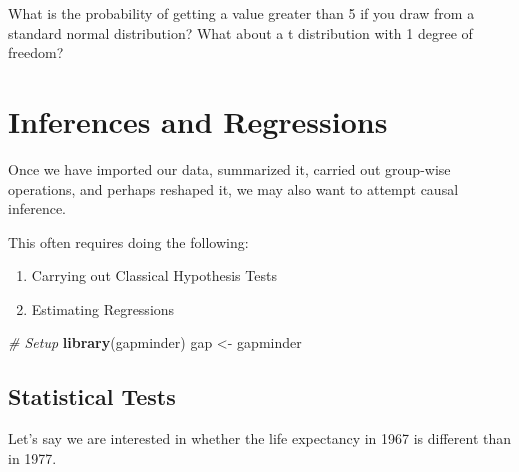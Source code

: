 \documentclass[]{book}
\newenvironment{Shaded}{\begin{snugshade}}{\end{snugshade}}
\newcommand{\KeywordTok}[1]{\textcolor[rgb]{0.13,0.29,0.53}{\textbf{#1}}}
\newcommand{\DecValTok}[1]{\textcolor[rgb]{0.00,0.00,0.81}{#1}}
\newcommand{\StringTok}[1]{\textcolor[rgb]{0.31,0.60,0.02}{#1}}
\newcommand{\CommentTok}[1]{\textcolor[rgb]{0.56,0.35,0.01}{\textit{#1}}}
\newcommand{\OperatorTok}[1]{\textcolor[rgb]{0.81,0.36,0.00}{\textbf{#1}}}
\newcommand{\NormalTok}[1]{#1}
\providecommand{\tightlist}{%
  \setlength{\itemsep}{0pt}\setlength{\parskip}{0pt}}
\begin{document}
What is the probability of getting a value greater than 5 if you draw
from a standard normal distribution? What about a t distribution with 1
degree of freedom?

\section{Inferences and Regressions}\label{inferences-and-regressions}

Once we have imported our data, summarized it, carried out group-wise
operations, and perhaps reshaped it, we may also want to attempt causal
inference.

This often requires doing the following:

\begin{enumerate}
\def\labelenumi{\arabic{enumi})}
\tightlist
\item
  Carrying out Classical Hypothesis Tests
\item
  Estimating Regressions
\end{enumerate}

\begin{Shaded}
\begin{Highlighting}[]
\CommentTok{# Setup}
\KeywordTok{library}\NormalTok{(gapminder)}
\NormalTok{gap <-}\StringTok{ }\NormalTok{gapminder}
\end{Highlighting}
\end{Shaded}

\subsection{Statistical Tests}\label{statistical-tests}

Let's say we are interested in whether the life expectancy in 1967 is
different than in 1977.

\begin{Shaded}
\end{Shaded}
\end{document}
